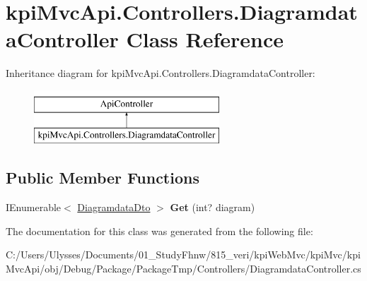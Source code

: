 \hypertarget{classkpi_mvc_api_1_1_controllers_1_1_diagramdata_controller}{}\section{kpi\+Mvc\+Api.\+Controllers.\+Diagramdata\+Controller Class Reference}
\label{classkpi_mvc_api_1_1_controllers_1_1_diagramdata_controller}
Inheritance diagram for kpi\+Mvc\+Api.\+Controllers.\+Diagramdata\+Controller\+:\begin{figure}[H]
\begin{center}
\leavevmode
\includegraphics[height=2.000000cm]{classkpi_mvc_api_1_1_controllers_1_1_diagramdata_controller}
\end{center}
\end{figure}
\subsection*{Public Member Functions}
\begin{DoxyCompactItemize}
\item 
\mbox{\label{classkpi_mvc_api_1_1_controllers_1_1_diagramdata_controller_a1e2708509e980e3e6eeb52477826dc87}} 
I\+Enumerable$<$ \hyperlink{classkpi_mvc_api_1_1_data_transfer_objects_1_1_diagramdata_dto}{Diagramdata\+Dto} $>$ {\bfseries Get} (int? diagram)
\end{DoxyCompactItemize}


The documentation for this class was generated from the following file\+:\begin{DoxyCompactItemize}
\item 
C\+:/\+Users/\+Ulysses/\+Documents/01\+\_\+\+Study\+Fhnw/815\+\_\+veri/kpi\+Web\+Mvc/kpi\+Mvc/kpi\+Mvc\+Api/obj/\+Debug/\+Package/\+Package\+Tmp/\+Controllers/Diagramdata\+Controller.\+cs\end{DoxyCompactItemize}
